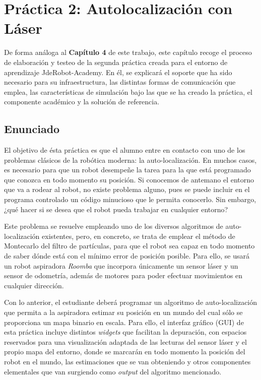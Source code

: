 \chapter{Práctica 2: Autolocalización con Láser}\label{cap.laserloc}
De forma análoga al  \textbf{Capítulo 4}  de este trabajo,  este capítulo recoge el proceso de elaboración y testeo de la segunda práctica creada para el entorno de aprendizaje JdeRobot-Academy. En él, se explicará el soporte que ha sido necesario para su infraestructura, las distintas formas de comunicación que emplea, las características de simulación bajo las que se ha creado la práctica, el componente académico y la solución de referencia.

\section{Enunciado} \label{sec.enunciado}
El objetivo de ésta práctica es que el alumno entre en contacto con uno de los problemas clásicos de la robótica moderna: la auto-localización. En muchos casos, es necesario para que un robot desempeñe la tarea para la que está programado que conozca en todo momento su posición. Si conocemos de antemano el entorno que va a rodear al robot, no existe problema alguno, pues se puede incluir en el programa controlado un código minucioso que le permita conocerlo. Sin embargo, ¿qué hacer si se desea que el robot pueda trabajar en cualquier entorno?

Este problema se resuelve empleando uno de los diversos algoritmos de auto-localización existentes, pero, en concreto, se trata de emplear el método de Montecarlo del filtro de partículas, para que el robot sea capaz en todo momento de saber dónde está con el mínimo error de posición posible. Para ello, se usará un robot aspiradora \textit{Roomba} que incorpora únicamente un sensor láser y un sensor de odometría, además de motores para poder efectuar movimientos en cualquier dirección. 

Con lo anterior, el estudiante deberá programar un algoritmo de auto-localización que permita a la aspiradora estimar su posición en un mundo del cual sólo se proporciona un mapa binario en escala. Para ello, el interfaz gráfico (GUI) de esta práctica incluye distintos \textit{widgets} que facilitan la depuración, con espacios reservados para una visualización adaptada de las lecturas del sensor láser y el propio mapa del entorno, donde se marcarán en todo momento la posición del robot en el mundo, las estimaciones que se van obteniendo y otros componentes elementales que van surgiendo como \textit{output} del algoritmo mencionado. 

